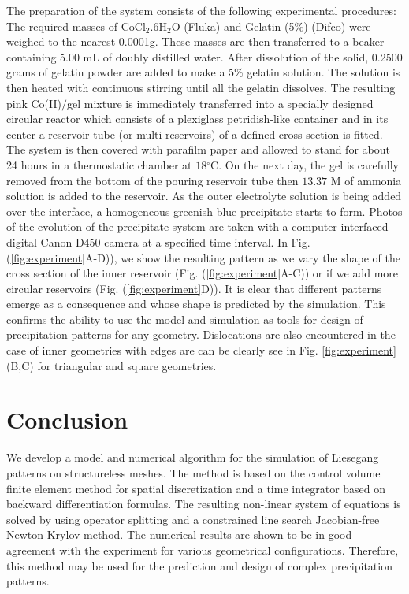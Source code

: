 \documentclass[aps,preprint]{revtex4}
\begin{document}
The preparation of the system consists of the following experimental
procedures: The required masses of CoCl$_{2}$.6H$_{2}$O (Fluka) and Gelatin
(5\%) (Difco) were weighed to the nearest 0.0001g. These masses are then
transferred to a beaker containing 5.00 mL of doubly distilled water. After
dissolution of the solid, 0.2500 grams of gelatin powder are added to make a
5\% gelatin solution. The solution is then heated with continuous stirring
until all the gelatin dissolves. The resulting pink Co(II)$/$gel mixture is
immediately transferred into a specially designed circular reactor which
consists of a plexiglass petridish-like container and in its center a
reservoir tube (or multi reservoirs) of a defined cross section is fitted. The
system is then covered with parafilm paper and allowed to stand for about 24
hours in a thermostatic chamber at $18{{}^{\circ}}$C. On the next day, the gel
is carefully removed from the bottom of the pouring reservoir tube then
$13.37$ M of ammonia solution is added to the reservoir. As the outer
electrolyte solution is being added over the interface, a homogeneous greenish
blue precipitate starts to form. Photos of the evolution of the precipitate
system are taken with a computer-interfaced digital Canon D450 camera at a
specified time interval. In Fig. (\ref{fig:experiment}A-D)), we show the
resulting pattern as we vary the shape of the cross section of the inner
reservoir (Fig. (\ref{fig:experiment}A-C)) or if we add more circular
reservoirs (Fig. (\ref{fig:experiment}D)). It is clear that different patterns
emerge as a consequence and whose shape is predicted by the simulation. This
confirms the ability to use the model and simulation as tools for design of
precipitation patterns for any geometry. 
Dislocations are also encountered in the case of inner geometries with edges are can be clearly see in 
Fig. \ref{fig:experiment}(B,C) for triangular and square geometries.


\section{Conclusion}

We develop a model and numerical algorithm for the simulation of Liesegang
patterns on structureless meshes. The method is based on the control volume
finite element method for spatial discretization and a time integrator based
on backward differentiation formulas. The resulting non-linear system of
equations is solved by using operator splitting and a constrained line
search Jacobian-free Newton-Krylov method. The numerical results are shown to
be in good agreement with the experiment for various geometrical
configurations. Therefore, this method may be used for the prediction and
design of complex precipitation patterns.
\end{document}
